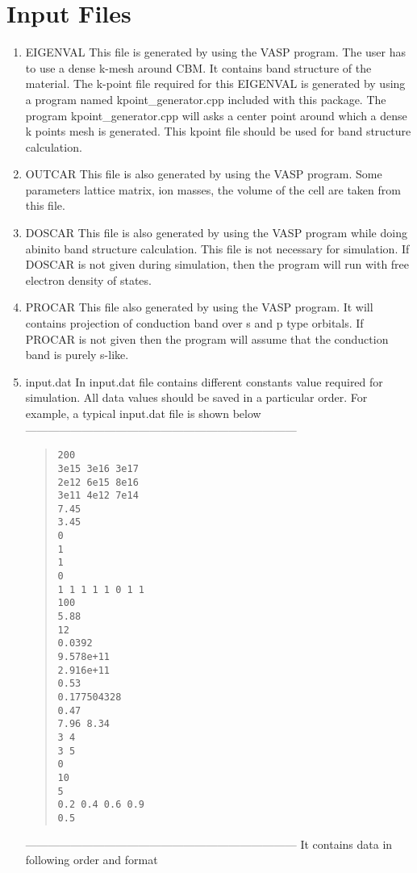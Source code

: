 \documentclass[12pt]{article}
\begin{document}
\section{Input Files} \label{input_files}
\begin{enumerate}
\item EIGENVAL  
\newline This file is generated by using the VASP program. The user has to use a
dense k-mesh around CBM. It contains band structure of the material. The k-point file required for this EIGENVAL is generated by using a program named kpoint\_generator.cpp included with this package. The program kpoint\_generator.cpp  will asks a center point around which a dense k points mesh is generated. This kpoint file should be used for band structure calculation. 
\item OUTCAR
\newline This file is also generated by using the VASP program. Some parameters lattice matrix, ion masses, the volume of the cell are taken from this file.
\item DOSCAR
\newline This file is also generated by using the VASP program while doing abinito band structure calculation. This file is not necessary for simulation. If DOSCAR is not given during simulation, then the program will run with free electron density of states. 
\item PROCAR
\newline This file also generated by using the VASP program. It will contains projection of conduction band over s and p type orbitals. If PROCAR is not given then the program will assume that the conduction band is purely s-like. 
\item input.dat
\newline In input.dat file contains different constants value required for simulation. All data values should be saved in a particular order. 
For example, a typical input.dat file is shown below 
\newline
\newpage ------------------------------------------------------------------------
\begin{quote}
\begin{verbatim}
200
3e15 3e16 3e17
2e12 6e15 8e16
3e11 4e12 7e14
7.45
3.45
0
1
1
0
1 1 1 1 1 0 1 1    
100
5.88
12             
0.0392
9.578e+11 
2.916e+11
0.53
0.177504328 	
0.47
7.96 8.34
3 4 
3 5
0
10
5
0.2 0.4 0.6 0.9
0.5
\end{verbatim}
\end{quote}
------------------------------------------------------------------------
\newline It contains data in following order and format 
\begin{enumerate}[label=\Roman*]


\end{enumerate}
\end{enumerate}
\end{document}
